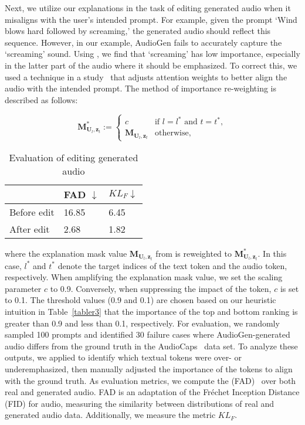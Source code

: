 Next, we utilize our explanations in the task of editing generated audio when it misaligns with the user's intended prompt. For example, given the prompt `Wind blows hard followed by screaming,' the generated audio should reflect this sequence. However, in our example, AudioGen fails to accurately capture the `screaming' sound. Using \mname{}, we find that `screaming' has low importance, especially in the latter part of the audio where it should be emphasized. To correct this, we used a technique in a study~\cite{hertz2022prompt} that adjusts attention weights to better align the audio with the intended prompt. The method of importance re-weighting is described as follows:

\begin{equation}
\textbf{M}^{*}_{\textbf{U}_{l}, \textbf{z}_{t}} := 
\begin{cases} 
c & \text{if } l=l^{*} \text{ and } t = t^{*}, \\ 
\textbf{M}_{\textbf{U}_{l}, \textbf{z}_{t}} & \text{otherwise},
\end{cases}
\end{equation}


\begin{table}[ht]
\centering
\begin{tabular}{l|l|l}
\toprule
   & FAD $\downarrow$ & $KL_{F} \downarrow$  \\ \hline
Before edit & 16.85 & 6.45 \\ 
After edit  & 2.68 & 1.82 \\ 
\bottomrule
\end{tabular}
\caption{Evaluation of editing generated audio}
\label{tab:edit}
\end{table}

\noindent where the explanation mask value $\textbf{M}_{\textbf{U}_{l}, \textbf{z}_{t}}$ from \mname{} is reweighted to $\textbf{M}^{*}_{\textbf{U}_{l}, \textbf{z}_{t}}$. In this case, $l^*$ and $t^*$ denote the target indices of the text token and the audio token, respectively.
When amplifying the explanation mask value, we set the scaling parameter $c$ to 0.9. Conversely, when suppressing the impact of the token, $c$ is set to 0.1. 
The threshold values (0.9 and 0.1) are chosen based on our heuristic intuition in Table~\ref{tabler3} that the importance of the top and bottom ranking is greater than 0.9 and less than 0.1, respectively.
For evaluation, we randomly sampled 100 prompts and identified 30 failure cases where AudioGen-generated audio differs from the ground truth in the AudioCaps~\cite{kim2019audiocaps} data set. To analyze these outputs, we applied \mname{} to identify which textual tokens were over- or underemphasized, then manually adjusted the importance of the tokens to align with the ground truth. 
As evaluation metrics, we compute the  (FAD)~\cite{fad} over both real and generated audio. FAD is an adaptation of the Fr\'echet Inception Distance (FID) for audio, measuring the similarity between distributions of real and generated audio data. Additionally, we measure the metric $KL_F$.

